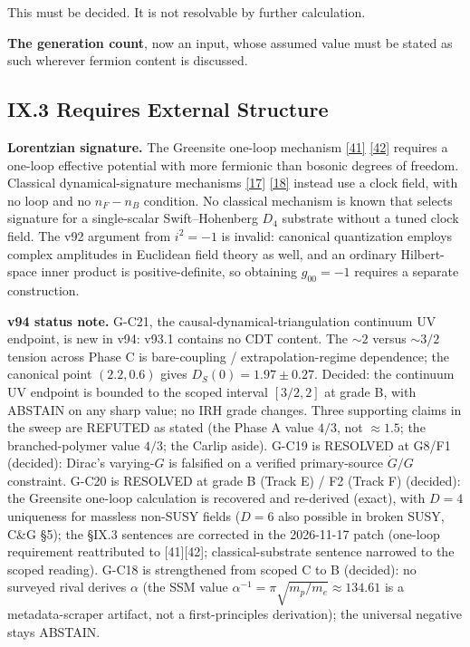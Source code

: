 \documentclass[a4paper,11pt]{article}
\begin{document}
This must be decided. It is not resolvable by further calculation.

\textbf{The generation count}, now an input, whose assumed value must be stated as such wherever fermion content is discussed.

\subsection*{IX.3 Requires External Structure}

\textbf{Lorentzian signature.} The Greensite one-loop mechanism \hyperref[ref41]{[41]} \hyperref[ref42]{[42]} requires a one-loop effective potential with more fermionic than bosonic degrees of freedom. Classical dynamical-signature mechanisms \hyperref[ref17]{[17]} \hyperref[ref18]{[18]} instead use a clock field, with no loop and no $n_F-n_B$ condition. No classical mechanism is known that selects signature for a single-scalar Swift–Hohenberg $D_4$ substrate without a tuned clock field. The v92 argument from $i^2=-1$ is invalid: canonical quantization employs complex amplitudes in Euclidean field theory as well, and an ordinary Hilbert-space inner product is positive-definite, so obtaining $g_{00}=-1$ requires a separate construction.

\textbf{v94 status note.} G-C21, the causal-dynamical-triangulation continuum UV endpoint, is new in v94: v93.1 contains no CDT content. The $\sim2$ versus $\sim3/2$ tension across Phase C is bare-coupling / extrapolation-regime dependence; the canonical point $(2.2,0.6)$ gives $D_S(0)=1.97\pm0.27$. Decided: the continuum UV endpoint is bounded to the scoped interval $[3/2,2]$ at grade B, with ABSTAIN on any sharp value; no IRH grade changes. Three supporting claims in the sweep are REFUTED as stated (the Phase A value $4/3$, not $\approx1.5$; the branched-polymer value $4/3$; the Carlip aside). G-C19 is RESOLVED at G8/F1 (decided): Dirac's varying-$G$ is falsified on a verified primary-source $\dot{G}/G$ constraint. G-C20 is RESOLVED at grade B (Track E) / F2 (Track F) (decided): the Greensite one-loop calculation is recovered and re-derived (exact), with $D=4$ uniqueness for massless non-SUSY fields ($D=6$ also possible in broken SUSY, C\&G \S5); the \S IX.3 sentences are corrected in the 2026-11-17 patch (one-loop requirement reattributed to [41][42]; classical-substrate sentence narrowed to the scoped reading). G-C18 is strengthened from scoped C to B (decided): no surveyed rival derives $\alpha$ (the SSM value $\alpha^{-1}=\pi\sqrt{m_p/m_e}\approx134.61$ is a metadata-scraper artifact, not a first-principles derivation); the universal negative stays ABSTAIN.
\end{document}
